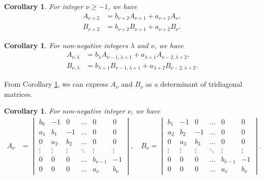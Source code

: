 \documentclass[12pt]{article}
\theoremstyle{plain}
\newtheorem{corollary}[theorem]{Corollary}
\theoremstyle{definition}
\theoremstyle{remark}
\begin{document}
\begin{corollary} \label{Th:Recurrence_Relation} For integer $ \nu \geq -1 $, we have
\begin{align*}
	A_{\nu + 2} &= b_{\nu + 2} A_{\nu + 1} + a_{\nu + 2} A_\nu, \\
	B_{\nu + 2} &= b_{\nu + 2} B_{\nu + 1} + a_{\nu + 2} B_\nu. 
\end{align*}
\end{corollary}

\begin{corollary} \label{Th:Index_Changing} For non-negative integers $ \lambda $ and $ \nu $, we have
\begin{align*}
	A_{\nu, \lambda} &= b_\lambda A_{\nu - 1, \lambda + 1} + a_{\lambda + 1} A_{\nu - 2, \lambda + 2}, \\
	B_{\nu, \lambda} &= b_{\lambda + 1} B_{\nu - 1, \lambda + 1} + a_{\lambda + 2} B_{\nu - 2, \lambda + 2}.
\end{align*}
\end{corollary}

From Corollary \ref{Th:Recurrence_Relation}, we can express $ A_\nu $ and $ B_\nu $ as a determinant of tridiagonal matrices.
\begin{corollary} \label{Th:Determinant_Form} For non-negative integer $ \nu $, we have
\begin{align*}
	A_\nu &= \begin{vmatrix} b_0 & -1 & 0 & \ldots & 0 & 0 \\ a_1 & b_1 & -1 & \ldots & 0 & 0 \\ 0 & a_2 & b_2 & \ldots & 0 & 0 \\ \vdots & \vdots & \vdots & \ddots & \vdots & \vdots \\ 0 & 0 & 0 & \ldots & b_{\nu - 1} & -1 \\ 0 & 0 & 0 & \ldots & a_\nu & b_\nu \end{vmatrix}, \quad B_\nu = \begin{vmatrix} b_1 & -1 & 0 & \ldots & 0 & 0 \\ a_2 & b_2 & -1 & \ldots & 0 & 0 \\ 0 & a_3 & b_3 & \ldots & 0 & 0 \\ \vdots & \vdots & \vdots & \ddots & \vdots & \vdots \\ 0 & 0 & 0 & \ldots & b_{\nu - 1} & -1 \\ 0 & 0 & 0 & \ldots & a_\nu & b_\nu \end{vmatrix}.
\end{align*}
\end{corollary}
\end{document}
